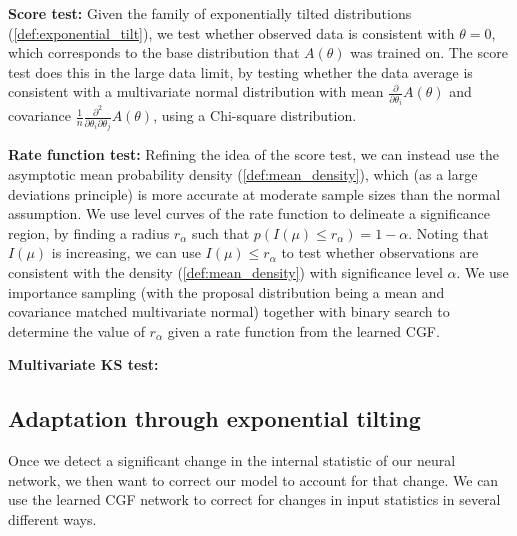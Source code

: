 \documentclass[11pt]{article}      %
\begin{document}
\noindent \textbf{Score test:} \cite{cox1979theoretical} 
Given the family of exponentially tilted distributions (\ref{def:exponential_tilt}), we test whether observed data is consistent with $\theta = 0$, which corresponds to the base distribution that $A(\theta)$ was trained on.
The score test does this in the large data limit, by testing whether the data average is consistent with a multivariate normal distribution with mean $\frac{\partial}{\partial \theta_i} A(\theta)$ and covariance $\frac{1}{n}\frac{\partial^2}{\partial \theta_i \partial \theta_j} A(\theta)$, using a Chi-square distribution.

\noindent \textbf{Rate function test:} Refining the idea of the score test, we can instead use the asymptotic mean probability density (\ref{def:mean_density}), which (as a large deviations principle) is more accurate at moderate sample sizes than the normal assumption.
We use level curves of the rate function to delineate a significance region, by finding a radius $r_\alpha$ such that $p(I(\mu) \le r_\alpha) = 1 - \alpha$.
Noting that $I(\mu)$ is increasing, we can use $I(\mu) \le r_\alpha$ to test whether observations are consistent with the density (\ref{def:mean_density}) with significance level $\alpha$.
We use importance sampling (with the proposal distribution being a mean and covariance matched multivariate normal) together with binary search to determine the value of $r_\alpha$ given a rate function from the learned CGF.


\noindent \textbf{Multivariate KS test:}








\newpage
\subsection{Adaptation through exponential tilting}
Once we detect a significant change in the internal statistic of our neural network, we then want to correct our model to account for that change.
We can use the learned CGF network to correct for changes in input statistics in several different ways.
\end{document}
